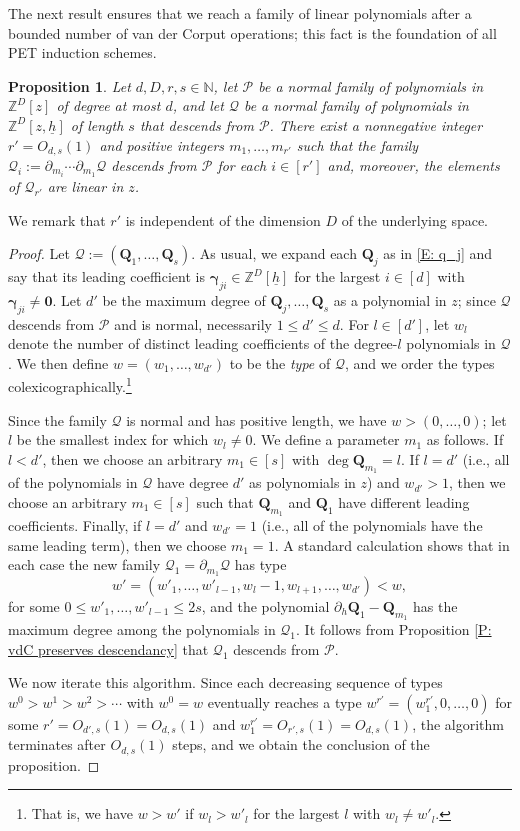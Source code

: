 \documentclass[11pt]{amsart}
\newtheorem{proposition}[lemma]{Proposition}
\theoremstyle{definition}
\newcommand{\N}{{\mathbb N}}
\newcommand{\Z}{{\mathbb Z}}
\newcommand{\CP}{{\mathcal P}}
\newcommand{\CQ}{{\mathcal Q}}
\newcommand{\bq}{{\textbf{Q}}}
\newcommand{\q}{{\textbf{Q}}}
\newcommand{\bgamma}{{\boldsymbol{\gamma}}}
\newcommand{\uh}{{\underline{h}}}
\begin{document}
    
    The next result ensures that we reach a family of linear polynomials after a bounded number of van der Corput operations; this fact is the foundation of all PET induction schemes. 
    \begin{proposition}\label{P: vdC terminates}
        Let $d, D, r, s\in\N$, let $\CP$ be a normal family of  polynomials in $\Z^D[z]$ of degree at most $d$, and let $\CQ$ be a normal family of polynomials in $\Z^D[z, \uh]$ of length $s$ that descends from $\CP$. There exist a nonnegative integer $r'=O_{d,s}(1)$ and positive integers $m_1, \ldots, m_{r'}$ such that the family $\CQ_i := \partial_{m_i}\cdots\partial_{m_1}\CQ$ descends from $\CP$ for each $i\in[r']$ and, moreover, the elements of $\CQ_{r'}$ are linear in $z$.
    \end{proposition}
    We remark that $r'$ is independent of the dimension $D$ of the underlying space.
    \begin{proof}
        Let $\CQ:=(\q_1, \ldots, \q_s)$. As usual, we expand each $\q_j$ as in \eqref{E: q_j} and say that its leading coefficient is $\bgamma_{ji}\in\Z^D[\uh]$ for the largest $i\in[d]$ with $\bgamma_{ji}\neq\mathbf{0}$. Let $d'$ be the maximum degree of $\bq_j, \ldots, \bq_s$ as a polynomial in $z$; since $\CQ$ descends from $\CP$ and is normal, necessarily $1\leq d'\leq d$.  For $l\in[d']$, let $w_l$ denote the number of distinct leading coefficients of the {degree-$l$} polynomials  in $\CQ$. We then define $w=(w_1, \ldots, w_{d'})$ to be the \textit{type} of $\CQ$, and we order the types colexicographically.\footnote{That is, we have $w>w'$ if $w_l>w'_l$ for the largest $l$ with $w_l \neq w'_l$.} 
        
        Since the family $\CQ$ is normal and has positive length, we have $w > (0, \ldots, 0)$; let $l$ be the smallest index for which $w_l\neq 0$. We define a parameter $m_1$ as follows.
        If $l<d'$, then we choose an arbitrary $m_1\in[s]$ with $\deg \bq_{m_1} = l$. If $l=d'$ (i.e., all of the polynomials in $\CQ$ have degree $d'$ as polynomials in $z$) and $w_{d'} > 1$, then we choose an arbitrary $m_1\in[s]$ such that $\bq_{m_1}$ and $\bq_1$ have different leading coefficients. Finally, if $l=d'$ and $w_{d'} =1$ (i.e., all of the polynomials have the same leading term),  then we choose ${m_1} = 1$. A standard calculation shows that in each case the new family $\CQ_1 = \partial_{m_1}\CQ$ has type $$w' = (w'_1, \ldots, w'_{l-1}, w_l-1, w_{l+1}, \ldots, w_{d'})<w,$$ for some $0\leq w'_1, \ldots, w'_{l-1}\leq 2s$, and the polynomial $\partial_h \bq_1 - \bq_{m_1}$ has the maximum degree among the polynomials in $\CQ_1$. It follows from Proposition \ref{P: vdC preserves descendancy} that $\CQ_1$ descends from $\CP$.
        
We now iterate this algorithm.  Since each decreasing sequence of types $w^0>w^1 > w^2 > \cdots$ with $w^0 = w$ eventually reaches a type $w^{r'} = (w^{r'}_1, 0, \ldots, 0)$ for some $r'=O_{d',s}(1)=O_{d,s}(1)$ 
and $w^{r'}_1=O_{r',s}(1)=O_{d,s}(1)$, the algorithm terminates after $O_{d,s}(1)$ steps, and we obtain the conclusion of the proposition.
\end{proof}
\end{document}
